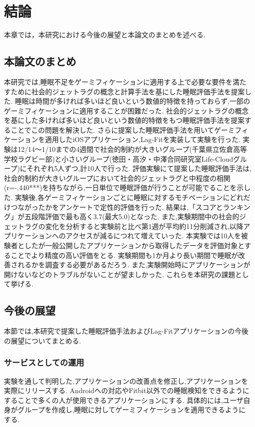 \chapter{結論}
本章では，本研究における今後の展望と本論文のまとめを述べる.

\section{本論文のまとめ}
本研究では,睡眠不足をゲーミフィケーションに適用する上で必要な要件を満たすために社会的ジェットラグの概念と計算手法を基にした睡眠評価手法を提案した.
睡眠は時間が多ければ多いほど良いという数値的特徴を持っておらず,一部のゲーミフィケーションに適用することが困難だった.
社会的ジェットラグの概念を基にした多ければ多いほど良いという数値的特徴をもつ睡眠評価手法を提案することでこの問題を解決した.
さらに提案した睡眠評価手法を用いてゲーミフィケーションを適用したiOSアプリケーション,Lag-Fitを実装して実験を行った.
実験は12/14〜1/10までの4週間で社会的制約が大きいグループ(千葉県立佐倉高等学校ラグビー部)と小さいグループ(徳田・高汐・中澤合同研究室Life-Cloudグループ)にそれぞれ5人ずつ,計10人で行った.
評価実験にて提案した睡眠評価手法は,社会的制約が大きいグループにおいて社会的ジェットラグと中程度の相関(r=-.440***)を持ちながら,一日単位で睡眠評価が行うことが可能でることを示した.
実験後,各ゲーミフィケーションごとに睡眠に対するモチベーションにどれだけつながったかをアンケートで定性的評価を行った.
結果は,「スコアとランキング」が五段階評価で最も高く3.7(最大5.0)となった.
また,実験期間中の社会的ジェットラグの変化を分析すると実験前と比べ第1週が平均約11分削減され,以降アプリケーションへのアクセスが減るにつれて増えていった.
本実験では10人を被験者としたが一般公開したアプリケーションから取得したデータを評価対象とすることでより精度の高い評価をとる.
実験期間も1か月より長い期間で睡眠が改善されるかを調査する必要があるだろう.
また,実験開始時にアプリケーションが開けないなどのトラブルがないことが望ましかった.
これらを本研究の課題として挙げる.

\section{今後の展望}
本節では,本研究で提案した睡眠評価手法およびLag-Fitアプリケーションの今後の展望についてまとめる.
\subsection{サービスとしての運用}
実験を通して判明した,アプリケーションの改善点を修正し,アプリケーションを実際にリリースする.
Androidへの対応やFitbit以外での睡眠検知をできるようにすることで多くの人が使用できるアプリケーションにする.
具体的には,ユーザ自身がグループを作成し,睡眠に対してゲーミフィケーションを適用できるようにする.

